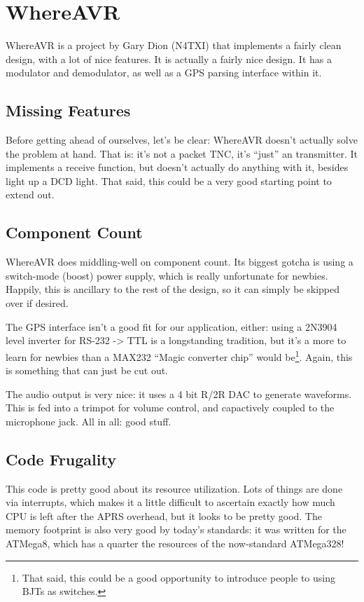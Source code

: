 \section{WhereAVR}

WhereAVR\cite{WhereAVR} is a project by Gary Dion (N4TXI) that
implements a fairly clean design, with a lot of nice features.  It is
actually a fairly nice design.  It has a modulator and demodulator, as
well as a GPS parsing interface within it.  

\subsection{Missing Features}

Before getting ahead of ourselves, let's be clear: WhereAVR doesn't
actually solve the problem at hand.  That is: it's not a packet TNC,
it's ``just'' an \aprs transmitter.  It implements a receive function,
but doesn't actually do anything with it, besides light up a DCD
light.  That said, this could be a very good starting point to extend
out.

\subsection{Component Count}

WhereAVR does middling-well on component count.  Its biggest gotcha is
using a switch-mode (boost) power supply, which is really unfortunate
for newbies.  Happily, this is ancillary to the rest of the design, so
it can simply be skipped over if desired.

The GPS interface isn't a good fit for our application, either: using
a 2N3904 level inverter for RS-232 -> TTL is a longstanding tradition,
but it's a more to learn for newbies than a MAX232 ``Magic converter
chip'' would be\footnote{That said, this could be a good opportunity
  to introduce people to using BJTs as switches.}.   Again, this is
something that can just be cut out.

The audio output is very nice: it uses a 4 bit R/2R DAC to generate
waveforms.  This is fed into a trimpot for volume control, and
capactively coupled to the microphone jack.  All in all: good stuff.

\subsection{Code Frugality}

This code is pretty good about its resource utilization.  Lots of
things are done via interrupts, which makes it a little difficult to
ascertain exactly how much CPU is left after the APRS overhead, but it
looks to be pretty good.  The memory footprint is also very good by
today's standards: it was written for the ATMega8, which has a quarter
the resources of the now-standard ATMega328!

